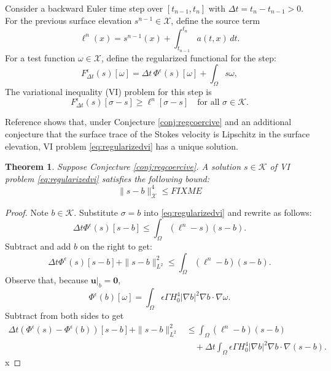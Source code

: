 \documentclass[12pt]{article}
\newtheorem{theorem}{Theorem}
\newcommand{\bu}{\ensuremath{\mathbf{u}}}
\newcommand{\bzero}{\ensuremath{\bm{0}}}
\newcommand{\cK}{\ensuremath{\mathcal{K}}}
\newcommand{\cX}{\ensuremath{\mathcal{X}}}
\newcommand{\grad}{\ensuremath{\nabla}}
\newcommand{\eps}{\ensuremath{\epsilon}}
\begin{document}
Consider a backward Euler time step over $[t_{n-1},t_n]$ with $\Delta t=t_n-t_{n-1} > 0$.  For the previous surface elevation $s^{n-1}\in\cX$, define the source term
\begin{equation}
\ell^n(x) = s^{n-1}(x) + \int_{t_{n-1}}^{t_n} a(t,x)\,dt. \label{eq:be:source}
\end{equation}
For a test function $\omega\in\cX$, define the regularized functional for the step:
\begin{equation}
F^\eps_{\Delta t}(s)[\omega] = \Delta t\,\Phi^\eps(s)[\omega] + \int_\Omega s \omega, \label{eq:regularizedF}
\end{equation}
The variational inequality (VI) problem for this step is
\begin{equation}
F^\eps_{\Delta t}(s)[\sigma-s] \ge \ell^n[\sigma-s] \quad \text{for all } \sigma \in \cK. \label{eq:regularizedvi}
\end{equation}

Reference \cite{Bueler2025} shows that, under Conjecture \ref{conj:regcoercive} and an additional conjecture that the surface trace of the Stokes velocity is Lipschitz in the surface elevation, VI problem \eqref{eq:regularizedvi} has a unique solution.

\begin{theorem}
Suppose Conjecture \ref{conj:regcoercive}.  A solution $s\in\cK$ of VI problem \eqref{eq:regularizedvi} satisfies the following bound:
\begin{equation}
\|s-b\|_{\cX}^4 \le FIXME \label{eq:thebound}
\end{equation}
\end{theorem}

\begin{proof}
Note $b\in\cK$.  Substitute $\sigma=b$ into \eqref{eq:regularizedvi} and rewrite as follows:
\begin{equation}
\Delta t \Phi^\eps(s)[s-b] \le \int_\Omega (\ell^n - s) (s - b).
\end{equation}
Subtract and add $b$ on the right to get:
\begin{equation}
\Delta t \Phi^\eps(s)[s-b] + \|s-b\|_{L^2}^2 \le \int_\Omega (\ell^n - b) (s - b).
\end{equation}
Observe that, because $\bu|_b=\bzero$,
\begin{equation}
\Phi^\eps(b)[\omega] = \int_\Omega \eps \Gamma H_0^4 |\grad b|^2 \grad b \cdot \grad\omega.
\end{equation}
Subtract from both sides to get
\begin{align*}
\Delta t (\Phi^\eps(s) - \Phi^\eps(b))[s-b] + \|s-b\|_{L^2}^2 &\le \int_\Omega (\ell^n - b) (s - b) \\
 &\quad + \Delta t \int_\Omega \eps \Gamma H_0^4 |\grad b|^2 \grad b \cdot \grad(s-b).
\end{align*}
x
\end{proof}



\end{document}
